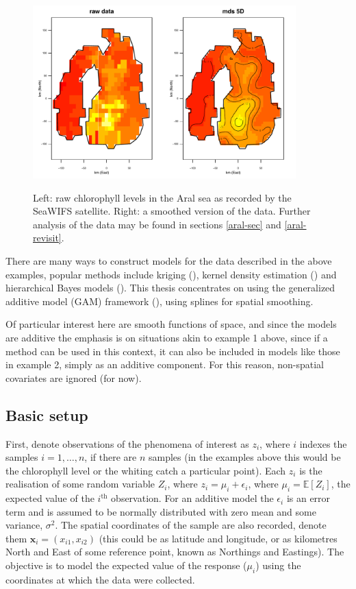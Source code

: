 \begin{figure}[tb]
\centering
\includegraphics[width=4in, trim=0in 0in 0in 0.3in, clip]{mds/figs/aral-5d-duchon.pdf}\\
\caption{Left: raw chlorophyll levels in the Aral sea as recorded by the SeaWIFS satellite. Right: a smoothed version of the data. Further analysis of the data may be found in sections \ref{aral-sec} and \ref{aral-revisit}.}
\label{aral-intro}
\end{figure}

There are many ways to construct models for the data described in the above examples, popular methods include kriging (\cite{diggle}), kernel density estimation (\cite{wandKDE}) and hierarchical Bayes models (\cite{banerjee}). This thesis concentrates on using the generalized additive model (GAM) framework (\cite{gammonograph}), using splines for spatial smoothing.

Of particular interest here are smooth functions of space, and since the models are additive the emphasis is on situations akin to example 1 above, since if a method can be used in this context, it can also be included in models like those in example 2, simply as an additive component. For this reason, non-spatial covariates are ignored (for now).

\subsection{Basic setup}

First, denote observations of the phenomena of interest as $z_i$, where $i$ indexes the samples $i=1,\ldots,n$, if there are $n$ samples (in the examples above this would be the chlorophyll level or the whiting catch a particular point). Each  $z_i$ is the realisation of some random variable $Z_i$, where $z_i=\mu_i+\epsilon_i$, where $\mu_i=\mathbb{E}[Z_i]$, the expected value of the $i^\text{th}$ observation. For an additive model the $\epsilon_i$ is an error term and is assumed to be normally distributed with zero mean and some variance, $\sigma^2$. The spatial coordinates of the sample are also recorded, denote them $\mathbf{x}_i = (x_{i1}, x_{i2})$ (this could be as latitude and longitude, or as kilometres North and East of some reference point, known as Northings and Eastings). The objective is to model the expected value of the response ($\mu_i$) using the coordinates at which the data were collected.


